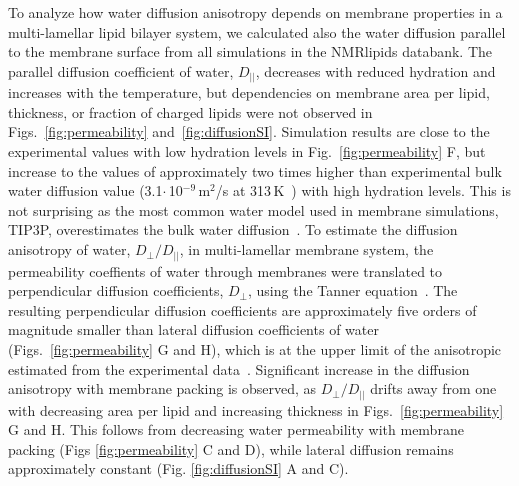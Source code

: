 \documentclass[fleqn,10pt]{wlscirep}
\begin{document}
To analyze how water diffusion anisotropy depends on membrane properties in a multi-lamellar lipid bilayer system, we calculated also the water diffusion parallel to the membrane surface from all simulations in the NMRlipids databank. The parallel diffusion coefficient of water, $D_{||}$, decreases with reduced hydration and increases with the temperature, but dependencies on membrane area per lipid, thickness, or fraction of charged lipids were not observed in Figs.~\ref{fig:permeability} and~\ref{fig:diffusionSI}.
Simulation results are close to the experimental values with low hydration levels in Fig.~\ref{fig:permeability} F, but increase to the values of approximately two times higher than experimental bulk water diffusion value (3.1$\cdot$\,10$^{-9}$\,m$^2$/s at 313\,K~\cite{khakimov08}) with high hydration levels. This is not surprising as the most common water model used in membrane simulations, TIP3P, overestimates the bulk water diffusion~\cite{pathirannahalage21}. To estimate the diffusion anisotropy of water, $D_{\perp}/D_{||}$, in multi-lamellar membrane system, the permeability coeffients of water through membranes were translated to perpendicular diffusion coefficients, $D_{\perp}$, using the Tanner equation~\cite{tanner78,wasterby02}. The resulting perpendicular diffusion coefficients are approximately five orders of magnitude smaller than lateral diffusion coefficients of water (Figs.~\ref{fig:permeability} G and H), which is at the upper limit of the anisotropic estimated from the experimental data~\cite{nitsche19}. 
Significant increase in the diffusion anisotropy with membrane packing is observed, as $D_{\perp}/D_{||}$ drifts away from one with decreasing area per lipid and increasing thickness in Figs.~\ref{fig:permeability} G and H. This follows from decreasing water permeability with membrane packing (Figs \ref{fig:permeability} C and D), while lateral diffusion remains approximately constant (Fig. \ref{fig:diffusionSI} A and C). 
\end{document}
